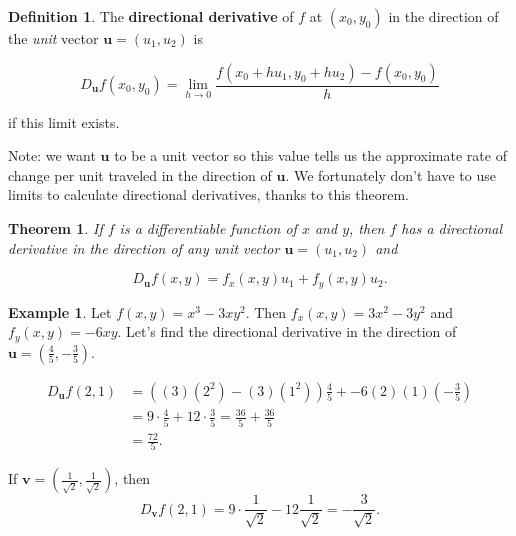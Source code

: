 \documentclass[
]{book}
\newtheorem{theorem}{Theorem}[chapter]
\theoremstyle{definition}
\newtheorem{definition}{Definition}[chapter]
\theoremstyle{definition}
\newtheorem{example}{Example}[chapter]
\theoremstyle{definition}
\theoremstyle{definition}
\theoremstyle{remark}
\begin{document}
\begin{defbox}

\begin{definition}
The \textbf{directional derivative} of \(f\) at \((x_0,y_0)\) in the direction of the \emph{unit} vector \(\mathbf{u}=(u_1,u_2)\) is

\[D_{\mathbf{u}}f(x_0,y_0)=\lim_{h\to 0}\frac{f(x_0+hu_1,y_0+hu_2)-f(x_0,y_0)}{h}\]

if this limit exists.
\end{definition}

\end{defbox}

Note: we want \(\mathbf{u}\) to be a unit vector so this value tells us the approximate rate of change per unit traveled in the direction of \(\mathbf{u}.\) We fortunately don't have to use limits to calculate directional derivatives, thanks to this theorem.

\begin{theorembox}

\begin{theorem}
If \(f\) is a differentiable function of \(x\) and \(y\), then \(f\) has a directional derivative in the direction of any unit vector \(\mathbf{u}=(u_1,u_2)\) and

\[D_{\mathbf{u}}f(x,y)=f_x(x,y)u_1+f_y(x,y)u_2.\]
\end{theorem}

\end{theorembox}

\begin{examplebox}

\begin{example}
Let \(f(x,y)=x^3-3xy^2\). Then \(f_x(x,y)=3x^2-3y^2\) and \(f_y(x,y)=-6xy\). Let's find the directional derivative in the direction of \(\mathbf{u}=(\frac{4}{5},-\frac{3}{5})\).

\begin{align*}
D_{\mathbf{u}}f(2,1)&=((3)(2^2)-(3)(1^2))\frac{4}{5}+-6(2)(1)(-\frac{3}{5})\\
&=9\cdot\frac{4}{5}+12\cdot\frac{3}{5}=\frac{36}{5}+\frac{36}{5}\\
&=\frac{72}{5}.
\end{align*}

If \(\mathbf{v}=(\frac{1}{\sqrt{2}},\frac{1}{\sqrt{2}})\), then
\[D_{\mathbf{v}}f(2,1)=9\cdot\frac{1}{\sqrt{2}}-12\frac{1}{\sqrt{2}}=-\frac{3}{\sqrt{2}}.\]
\end{example}

\end{examplebox}
\end{document}
